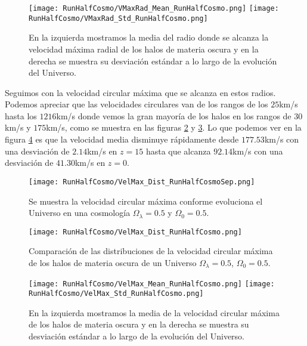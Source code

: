\begin{figure}[H]
    \centering
    \texttt{[image: RunHalfCosmo/VMaxRad\_Mean\_RunHalfCosmo.png]}
    \texttt{[image: RunHalfCosmo/VMaxRad\_Std\_RunHalfCosmo.png]}
    \caption[Media y desviación estándar del Radio donde se alcanza la velocidad máxima radial de un Universo $\Omega_\lambda = 0.5$, $\Omega_0 = 0.5$]{\footnotesize En la izquierda mostramos la media del radio donde se alcanza la velocidad máxima radial de los halos de materia oscura y en la derecha se muestra su desviación estándar a lo largo de la evolución del Universo.}
    \label{fig:HalfCosmo-VMaxRadStats}
\end{figure}

Seguimos con la velocidad circular máxima que se alcanza en estos radios. Podemos apreciar que las velocidades circulares van de los rangos de los $25$km/s hasta los $1216$km/s donde vemos la gran mayoría de los halos en los rangos de $30$km/s y $175$km/s, como se muestra en las figuras \ref{fig:HalfCosmo-VelMaxDistSep} y \ref{fig:HalfCosmo-VelMaxDist}. Lo que podemos ver en la figura \ref{fig:HalfCosmo-VelMaxStats} es que la velocidad  media disminuye rápidamente desde $177.53$km/s con una desviación de $2.14$km/s en $z=15$ hasta que alcanza $92.14$km/s con una desviación de $41.30$km/s en $z=0$. 

\begin{figure}[H]
    \centering
    \texttt{[image: RunHalfCosmo/VelMax\_Dist\_RunHalfCosmoSep.png]}
    \caption[Velocidad circular máxima en la evolución de un Universo $\Omega_\lambda = 0.5 $, $\Omega_0 = 0.5$]{\footnotesize Se muestra la velocidad circular máxima conforme evoluciona el Universo en una cosmología $\Omega_\lambda = 0.5 $ y $\Omega_0 = 0.5$.}
    \label{fig:HalfCosmo-VelMaxDistSep}
\end{figure}

\begin{figure}[H]
    \centering
    \texttt{[image: RunHalfCosmo/VelMax\_Dist\_RunHalfCosmo.png]}
    \caption[Distribución de la velocidad circular máxima de un Universo $\Omega_\lambda = 0.5 $, $\Omega_0 = 0.5$]{\footnotesize Comparación de las distribuciones de la velocidad circular máxima de los halos de materia oscura de un Universo $\Omega_\lambda = 0.5 $, $\Omega_0 = 0.5$.}
    \label{fig:HalfCosmo-VelMaxDist}
\end{figure}

\begin{figure}[H]
    \centering
    \texttt{[image: RunHalfCosmo/VelMax\_Mean\_RunHalfCosmo.png]}
    \texttt{[image: RunHalfCosmo/VelMax\_Std\_RunHalfCosmo.png]}
    \caption[Media y desviación estándar de la velocidad circular máxima de un Universo $\Omega_\lambda = 0.5 $, $\Omega_0 = 0.5$]{\footnotesize En la izquierda mostramos la media de la velocidad circular máxima de los halos de materia oscura y en la derecha se muestra su desviación estándar a lo largo de la evolución del Universo.}
    \label{fig:HalfCosmo-VelMaxStats}
\end{figure}

